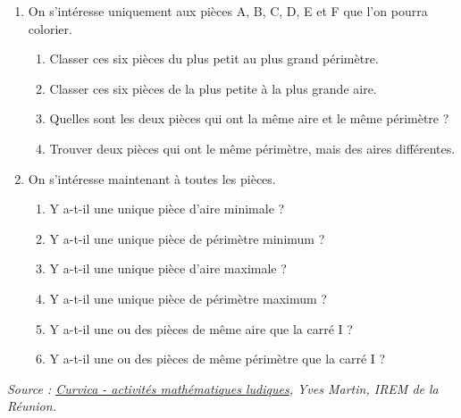 \begin{activite}
\begin{QCM}
      \begin{spacing}{1.5}
      \begin{enumerate}
         \item On s’intéresse uniquement aux pièces A, B, C, D, E et F que l'on pourra colorier.
            \begin{enumerate}
               \item Classer ces six pièces du plus petit au plus grand périmètre. \pointilles
               \item Classer ces six pièces de la plus petite à la plus grande aire. \pointilles
               \item Quelles sont les deux pièces qui ont la même aire et le même périmètre ? \pointilles
               \item Trouver deux pièces qui ont le même périmètre, mais des aires différentes. \pointilles 
            \end{enumerate}
         \item On s'intéresse maintenant à toutes les pièces.
            \begin{enumerate}
               \item Y a-t-il une unique pièce d’aire minimale ? \pointilles
               \item Y a-t-il une unique pièce de périmètre minimum ? \pointilles             
               \item Y a-t-il une unique pièce d’aire maximale ? \pointilles           
               \item Y a-t-il une unique pièce de périmètre maximum ? \pointilles         
               \item Y a-t-il une ou des pièces de même aire que la carré I ? \pointilles
               \item Y a-t-il une ou des pièces de même périmètre que la carré I ? \pointilles \\ [-15mm]
            \end{enumerate}
      \end{enumerate}
      \end{spacing}
   \end{QCM}
\end{activite}

\vfill\hfill{\small\it Source : \href{https://irem.univ-reunion.fr/spip.php?article802}{Curvica - activités mathématiques ludiques}, Yves Martin, IREM de la Réunion.}


\cours 

